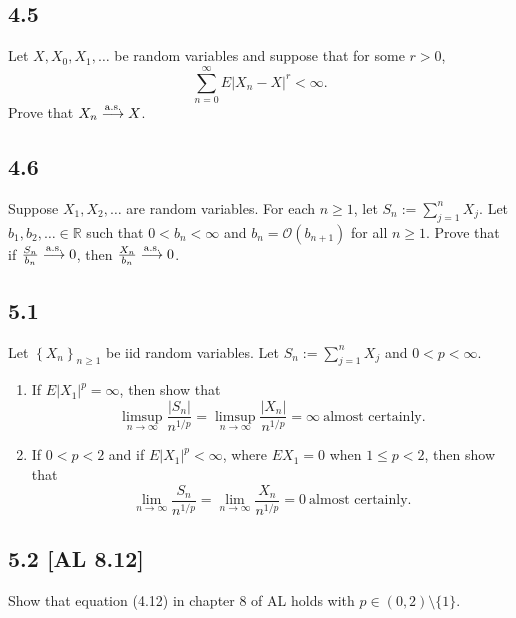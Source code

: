 \documentclass[12pt]{article}
\begin{document}
\newpage
\subsection*{4.5}
\begin{tcolorbox}
Let $X, X_{0}, X_{1}, \hdots$ be random variables and suppose that for some $r > 0$,
\[ \sum_{n=0}^{\infty}E|X_{n} - X|^{r} < \infty. \]
Prove that $X_{n} \stackrel{\text{a.s.}}{\longrightarrow} X$.
\end{tcolorbox}


\subsection*{4.6}
\begin{tcolorbox}
Suppose $X_{1}, X_{2}, \hdots$ are random variables. For each $n \geq 1$, let $S_{n} := \sum_{j=1}^{n}X_{j}$. Let $b_{1}, b_{2}, \hdots \in
\mathbb{R}$ such that $0 < b_{n} < \infty$ and $b_{n} = \mathcal{O}(b_{n+1})$ for all $n \geq 1$. Prove that if 
$\frac{S_{n}}{b_{n}} \stackrel{\text{a.s.}}{\longrightarrow} 0$, then $\frac{X_{n}}{b_{n}} \stackrel{\text{a.s.}}{\longrightarrow} 0$.
\end{tcolorbox}



\subsection*{5.1}
\begin{tcolorbox}
Let $\left\{ X_{n} \right\}_{n\geq 1}$ be iid random variables. Let $S_{n} := \sum_{j=1}^{n}X_{j}$ and $0 < p < \infty$.
\begin{enumerate}[label=(\alph*),topsep=3mm]
\item If $E|X_{1}|^{p} = \infty$, then show that 
\[ \limsup_{n\rightarrow\infty}\frac{|S_{n}|}{n^{1/p}} = \limsup_{n\rightarrow\infty}\frac{|X_{n}|}{n^{1/p}} = \infty \ \text{almost certainly}. \]
\item If $0 < p < 2$ and if $E|X_{1}|^{p} < \infty$, where $EX_{1} = 0$ when $1 \leq p < 2$, then show that 
\[ \lim_{n\rightarrow\infty}\frac{S_{n}}{n^{1/p}} = \lim_{n\rightarrow\infty}\frac{X_{n}}{n^{1/p}} = 0 \ \text{almost certainly}. \]
\end{enumerate}
\end{tcolorbox}


\subsection*{5.2 [AL 8.12]}
\begin{tcolorbox}
Show that equation (4.12) in chapter 8 of AL holds with $p \in (0,2) \setminus \{1\}$.
\end{tcolorbox}
\end{document}

